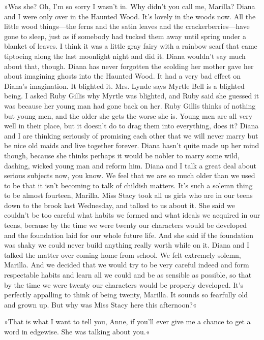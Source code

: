 »Was she? Oh, I’m so sorry I wasn’t in. Why didn’t you call me, Marilla? Diana and I were only over in the Haunted Wood. It’s lovely in the woods now. All the little wood things—the ferns and the satin leaves and the crackerberries—have gone to sleep, just as if somebody had tucked them away until spring under a blanket of leaves. I think it was a little gray fairy with a rainbow scarf that came tiptoeing along the last moonlight night and did it. Diana wouldn’t say much about that, though. Diana has never forgotten the scolding her mother gave her about imagining ghosts into the Haunted Wood. It had a very bad effect on Diana’s imagination. It blighted it. Mrs. Lynde says Myrtle Bell is a blighted being. I asked Ruby Gillis why Myrtle was blighted, and Ruby said she guessed it was because her young man had gone back on her. Ruby Gillis thinks of nothing but young men, and the older she gets the worse she is. Young men are all very well in their place, but it doesn’t do to drag them into everything, does it? Diana and I are thinking seriously of promising each other that we will never marry but be nice old maids and live together forever. Diana hasn’t quite made up her mind though, because she thinks perhaps it would be nobler to marry some wild, dashing, wicked young man and reform him. Diana and I talk a great deal about serious subjects now, you know. We feel that we are so much older than we used to be that it isn’t becoming to talk of childish matters. It’s such a solemn thing to be almost fourteen, Marilla. Miss Stacy took all us girls who are in our teens down to the brook last Wednesday, and talked to us about it. She said we couldn’t be too careful what habits we formed and what ideals we acquired in our teens, because by the time we were twenty our characters would be developed and the foundation laid for our whole future life. And she said if the foundation was shaky we could never build anything really worth while on it. Diana and I talked the matter over coming home from school. We felt extremely solemn, Marilla. And we decided that we would try to be very careful indeed and form respectable habits and learn all we could and be as sensible as possible, so that by the time we were twenty our characters would be properly developed. It’s perfectly appalling to think of being twenty, Marilla. It sounds so fearfully old and grown up. But why was Miss Stacy here this afternoon?«

»That is what I want to tell you, Anne, if you’ll ever give me a chance to get a word in edgewise. She was talking about you.«

